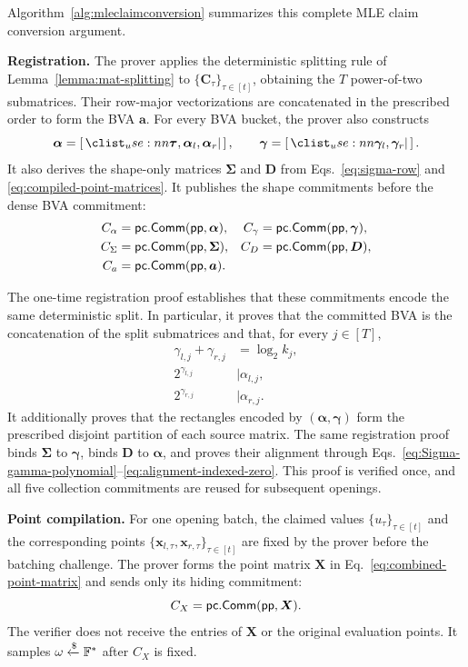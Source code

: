 Algorithm~\ref{alg:mleclaimconversion} summarizes this complete MLE claim
conversion argument.



\mysmallskip\noindent
\textbf{Registration.}
The prover applies the deterministic splitting rule of
Lemma~\ref{lemma:mat-splitting} to
$\{\bm C_\tau\}_{\tau\in[t]}$, obtaining the $T$ power-of-two submatrices.
Their row-major vectorizations are concatenated in the prescribed order to
form the BVA $\bm a$.  For every BVA bucket, the prover also constructs
\[
    \bm\alpha
    =
    \concat{\bm\tau,\bm\alpha_l,\bm\alpha_r},
    \qquad
    \bm\gamma
    =
    \concat{\bm\gamma_l,\bm\gamma_r}.
\]
It also derives the shape-only matrices $\bm\Sigma$ and $\bm D$ from
Eqs.~\eqref{eq:sigma-row} and
\eqref{eq:compiled-point-matrices}.  It publishes the shape commitments
before the dense BVA commitment:
\[
\begin{aligned}
    C_\alpha&={\sf pc}.{\sf Comm}({\sf pp},\bm\alpha),
    &C_\gamma&={\sf pc}.{\sf Comm}({\sf pp},\bm\gamma),\\
    C_\Sigma&={\sf pc}.{\sf Comm}({\sf pp},\bm\Sigma),
    &C_D&={\sf pc}.{\sf Comm}({\sf pp},\bm D),\\
    C_a&={\sf pc}.{\sf Comm}({\sf pp},\bm a).
\end{aligned}
\]

The one-time registration proof establishes that these commitments encode the
same deterministic split.  In particular, it proves that the committed BVA
is the concatenation of the split submatrices and that, for every
$j\in[T]$,
\[
\begin{aligned}
    \gamma_{l,j}+\gamma_{r,j}
        &=\log_2k_j,\\
    2^{\gamma_{l,j}}
        &\mid\alpha_{l,j},\\
    2^{\gamma_{r,j}}
        &\mid\alpha_{r,j}.
\end{aligned}
\]
It additionally proves that the rectangles encoded by
$(\bm\alpha,\bm\gamma)$ form the prescribed disjoint partition of each
source matrix.  The same registration proof binds $\bm\Sigma$ to
$\bm\gamma$, binds $\bm D$ to $\bm\alpha$, and proves their alignment through
Eqs.~\eqref{eq:Sigma-gamma-polynomial}--\eqref{eq:alignment-indexed-zero}.
This proof is verified once, and all five collection commitments are reused
for subsequent openings.

\mysmallskip\noindent
\textbf{Point compilation.}
For one opening batch, the claimed values
$\{u_\tau\}_{\tau\in[t]}$ and the corresponding points
$\{\bm x_{l,\tau},\bm x_{r,\tau}\}_{\tau\in[t]}$ are fixed by the prover
before the batching challenge.  The prover forms the point matrix $\bm X$ in
Eq.~\eqref{eq:combined-point-matrix} and sends only its hiding commitment:
\[
    C_X={\sf pc}.{\sf Comm}({\sf pp},\bm X).
\]
The verifier does not receive the entries of $\bm X$ or the original
evaluation points.  It samples $\omega\mathrel{\xleftarrow{\$}}{\mathbb{F}}^*$ after $C_X$ is
fixed.

